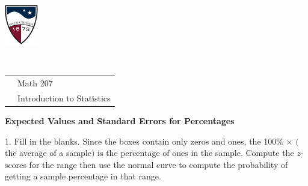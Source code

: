 \documentclass[10pt]{article}
\begin{document}
\pagestyle{empty}
\lstset{language=R, showspaces=false, showstringspaces=false}

\href{http://www.su.edu}{\includegraphics[height=1.75cm]{sulogo.eps}}
\vspace{-1.79cm}

{{\ }\hfill\small
\begin{tabular}{cl}
& Math 207\\
& Introduction to Statistics\\
\end{tabular}
}
\setlength{\baselineskip}{1.05\baselineskip}
\medskip

\begin{center}
\textbf{\large   Expected Values and Standard Errors for Percentages}
\end{center}

1. Fill in the blanks.  Since the boxes contain only zeros and ones, the
100\% $\times$ $($the average of a sample$)$ is the percentage of ones in the sample.
Compute the $z$-scores for the range then use
the normal curve to compute the probability of getting a sample percentage
in that range.
\vspace{-8pt}
\end{document}
